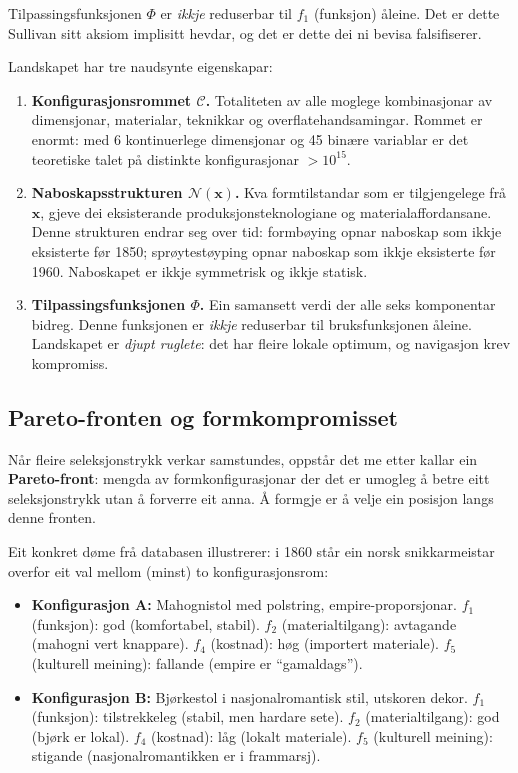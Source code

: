 \documentclass[10pt, a4paper, twocolumn]{article}
\begin{document}
\noindent Tilpassingsfunksjonen $\Phi$ er \emph{ikkje} reduserbar til $f_1$ (funksjon) åleine. Det er dette Sullivan sitt aksiom implisitt hevdar, og det er dette dei ni bevisa falsifiserer.

Landskapet har tre naudsynte eigenskapar:

\begin{enumerate}
  \item \textbf{Konfigurasjonsrommet $\mathcal{C}$.} Totaliteten av alle moglege kombinasjonar av dimensjonar, materialar, teknikkar og overflatehandsamingar. Rommet er enormt: med 6 kontinuerlege dimensjonar og 45 binære variablar er det teoretiske talet på distinkte konfigurasjonar $> 10^{15}$.

  \item \textbf{Naboskapsstrukturen $\mathcal{N}(\mathbf{x})$.} Kva formtilstandar som er tilgjengelege frå $\mathbf{x}$, gjeve dei eksisterande produksjonsteknologiane og materialaffordansane. Denne strukturen endrar seg over tid: formbøying opnar naboskap som ikkje eksisterte før 1850; sprøytestøyping opnar naboskap som ikkje eksisterte før 1960. Naboskapet er ikkje symmetrisk og ikkje statisk.

  \item \textbf{Tilpassingsfunksjonen $\Phi$.} Ein samansett verdi der alle seks komponentar bidreg. Denne funksjonen er \emph{ikkje} reduserbar til bruksfunksjonen åleine. Landskapet er \emph{djupt ruglete}: det har fleire lokale optimum, og navigasjon krev kompromiss.
\end{enumerate}


\subsection{Pareto-fronten og formkompromisset}

Når fleire seleksjonstrykk verkar samstundes, oppstår det me etter \citet{deb2001} kallar ein \textbf{Pareto-front}: mengda av formkonfigurasjonar der det er umogleg å betre eitt seleksjonstrykk utan å forverre eit anna. Å formgje er å velje ein posisjon langs denne fronten.

Eit konkret døme frå databasen illustrerer: i 1860 står ein norsk snikkarmeistar overfor eit val mellom (minst) to konfigurasjonsrom:

\begin{itemize}
  \item \textbf{Konfigurasjon A:} Mahognistol med polstring, empire-proporsjonar. $f_1$ (funksjon): god (komfortabel, stabil). $f_2$ (materialtilgang): avtagande (mahogni vert knappare). $f_4$ (kostnad): høg (importert materiale). $f_5$ (kulturell meining): fallande (empire er ``gamaldags'').

  \item \textbf{Konfigurasjon B:} Bjørkestol i nasjonalromantisk stil, utskoren dekor. $f_1$ (funksjon): tilstrekkeleg (stabil, men hardare sete). $f_2$ (materialtilgang): god (bjørk er lokal). $f_4$ (kostnad): låg (lokalt materiale). $f_5$ (kulturell meining): stigande (nasjonalromantikken er i frammarsj).
\end{itemize}
\end{document}

